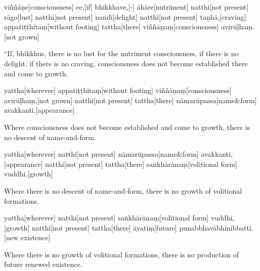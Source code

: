 \vskip 0.2in
\begin{samepage}
\begingl[glneveryline={\PaliGlossA,\PaliGlossB}]
viññāṇe[consciousness] ce,[if] bhikkhave,[-] āhāre[nutriment] natthi[not present] rāgo[lust] natthi[not present] nandī[delight] natthi[not present] taṇhā,[craving] appatiṭṭhitaṃ[without footing] tattha[there] viññāṇaṃ[consciousness] avirūḷhaṃ.[not grown]
\endgl
\nopagebreak
\linespread{0.5}
\begin{spacin}{0.2}
{\PaliGlossFT “If, bhikkhus, there is no lust for the nutriment consciousness, if there is no delight, if there is no craving, consciousness does not become established there and come to growth.}
\end{spacin}
\vskip 12pt
\end{samepage}
\begin{samepage}
\begingl[glneveryline={\PaliGlossA,\PaliGlossB}]
yattha[wherever] appatiṭṭhitaṃ[without footing] viññāṇaṃ[consciousness] avirūḷhaṃ,[not grown] natthi[not present] tattha[there] nāmarūpassa[name\&form] avakkanti.[appearance]
\endgl
\nopagebreak
\linespread{0.5}
\begin{spacin}{0.2}
{\PaliGlossFT Where consciousness does not become established and come to growth, there is no descent of name-and-form.}
\end{spacin}
\vskip 12pt
\end{samepage}
\begin{samepage}
\begingl[glneveryline={\PaliGlossA,\PaliGlossB}]
yattha[wherever] natthi[not present] nāmarūpassa[name\&form] avakkanti,[appearance] natthi[not present] tattha[there] saṅkhārānaṃ[volitional form] vuddhi.[growth]
\endgl
\nopagebreak
\linespread{0.5}
\begin{spacin}{0.2}
{\PaliGlossFT Where there is no descent of name-and-form, there is no growth of volitional formations.}
\end{spacin}
\vskip 12pt
\end{samepage}
\begin{samepage}
\begingl[glneveryline={\PaliGlossA,\PaliGlossB}]
yattha[wherever] natthi[not present] saṅkhārānaṃ[volitional form] vuddhi,[growth] natthi[not present] tattha[there] āyatiṃ[future] punabbhavābhinibbatti.[new existence]
\endgl
\nopagebreak
\linespread{0.5}
\begin{spacin}{0.2}
{\PaliGlossFT Where there is no growth of volitional formations, there is no production of future renewed existence.}
\end{spacin}
\vskip 12pt
\end{samepage}
